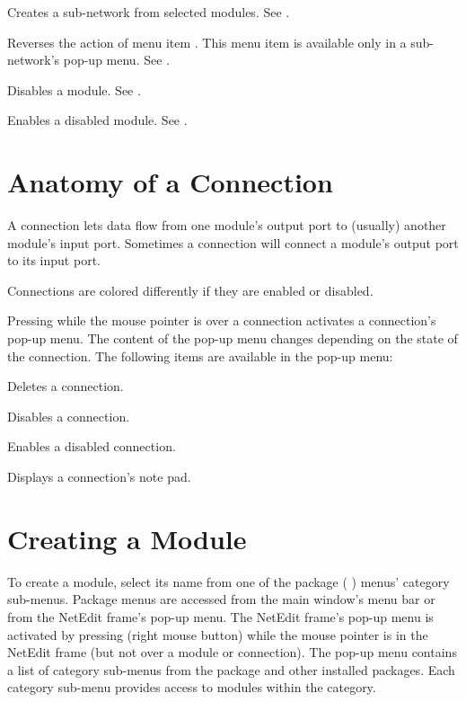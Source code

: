 \begin{description}
\begin{description}
     Creates a sub-network from
    selected modules.  See .
    
     Reverses the action of menu item
    .  This menu item is available only in
    a sub-network's pop-up menu.  See .
    
     Disables a module.  See
    .
    
     Enables a disabled module.  See
    .

  \end{description}
\end{description}


\section{Anatomy of a Connection}
\label{sec:anatcon}

A connection lets data flow from one module's output port to (usually) another
module's input port.  Sometimes a connection will connect a module's
output port to its input port.

Connections are colored differently if they are enabled or disabled.

Pressing  while the mouse pointer is over a connection
activates a connection's pop-up menu.  The content of the pop-up menu
changes depending on the state of the connection. The following items are
available in the pop-up menu:

\begin{description}
   Deletes a connection.
  
   Disables a connection.
  
   Enables a disabled connection.

   Displays a connection's note pad.
\end{description}

\section{Creating a Module}
\label{sec:creatingmodules}

To create a module, select its name from one of the package (\eg{}
\sr) menus' category sub-menus. Package menus are accessed from the
main window's menu bar or from the NetEdit frame's pop-up menu.  The
NetEdit frame's pop-up menu is activated by pressing
 (right mouse button) while the mouse pointer is in
the NetEdit frame (but not over a module or connection).  The pop-up
menu contains a list of category sub-menus from the \sr{} package and
other installed packages.  Each category sub-menu provides access to
modules within the category.

